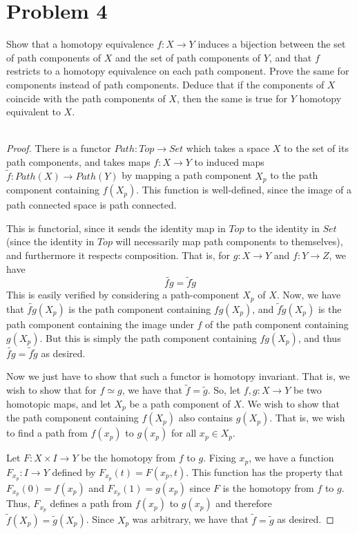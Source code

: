 \documentclass[fontsize=11pt]{scrartcl} %
\numberwithin{equation}{section} %
\numberwithin{figure}{section} %
\numberwithin{table}{section} %
\begin{document}
\section*{Problem 4}
Show that a homotopy equivalence $f:X\to Y$ induces a bijection between the set
of path components of $X$ and the set of path components of $Y$, and that $f$
restricts to a homotopy equivalence on each path component. Prove the same for
components instead of path components. Deduce that if the components of $X$
coincide with the path components of $X$, then the same is true for $Y$ homotopy
equivalent to $X$.
\\
\\
\begin{proof}
    There is a functor $Path:Top\to Set$ which takes a space $X$ to the set of
    its path components, and takes maps $f:X\to Y$ to induced maps
    $\tilde{f}:Path(X)\to Path(Y)$ by mapping a path component $X_p$ to the path
    component containing $f(X_p)$. This function is well-defined, since the
    image of a path connected space is path connected.

    This is functorial, since it sends the identity map in $Top$ to the identity
    in $Set$ (since the identity in $Top$ will necessarily map path components
    to themselves), and furthermore it respects composition. That is, for
    $g:X\to Y$ and $f:Y\to Z$, we have
    \[
        \widetilde{fg} = \tilde{f}\tilde{g}
    \]
    This is easily verified by considering a path-component $X_p$ of $X$. Now,
    we have that $\widetilde{fg}(X_p)$ is the path component containing
    $fg(X_p)$, and $\tilde{f}\tilde{g}(X_p)$ is the path component containing
    the image under $f$ of the path component containing $g(X_p)$. But this is
    simply the path component containing $fg(X_p)$, and thus
    $\widetilde{fg}=\tilde{f}\tilde{g}$ as desired.

    Now we just have to show that such a functor is homotopy invariant. That is,
    we wish to show that for $f\simeq g$, we have that $\tilde{f}=\tilde{g}$.
    So, let $f,g:X\to Y$ be two homotopic maps, and let $X_p$ be a path
    component of $X$. We wish to show that the path component containing
    $f(X_p)$ also contains $g(X_p)$. That is, we wish to find a path from
    $f(x_p)$ to $g(x_p)$ for all $x_p\in X_p$. 
    
    Let $F:X\times I\to Y$ be the
    homotopy from $f$ to $g$. Fixing $x_p$, we have a function $F_{x_p}:I\to Y$
    defined by $F_{x_p}(t) = F(x_p,t)$. This function has the property that
    $F_{x_p}(0)=f(x_p)$ and $F_{x_p}(1)=g(x_p)$ since $F$ is the homotopy from
    $f$ to $g$. Thus, $F_{x_p}$ defines a path from $f(x_p)$ to $g(x_p)$ and
    therefore $\tilde{f}(X_p)=\tilde{g}(X_p)$. Since $X_p$ was arbitrary, we
    have that $\tilde{f}=\tilde{g}$ as desired.


\end{proof}
\end{document}
